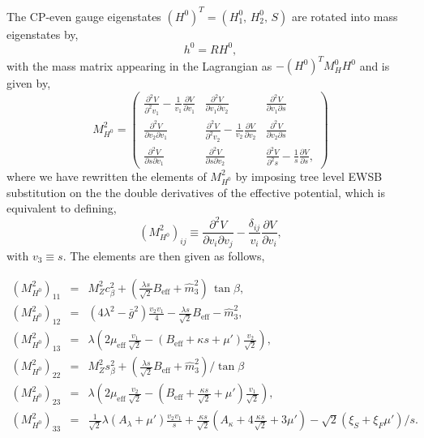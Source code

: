 \documentclass[final,3p,times,pdflatex]{elsarticle}
\newcommand{\be}{\begin{equation}}
\newcommand{\ee}{\end{equation}}
\newcommand{\ba}{\begin{eqnarray}}
\newcommand{\ea}{\end{eqnarray}}
\newcommand{\ds}{\displaystyle}
\begin{document}
The CP-even gauge eigenstates $(H^0)^T = (H_1^0,\, H_2^0, \, S)$ are rotated into mass eigenstates by,
\be h^0 = R H^0, \ee with the mass matrix appearing in the Lagrangian as  $-(H^0)^T M_H^0 H^0$ and is given by,
\be
M_{H^0}^2=
\left(
\begin{array}{ccc}
\ds\frac{\partial^2 V}{\partial^2 v_1 } - \ds\frac{1}{v_1}\frac{\partial V}{\partial v_1}&
\ds\frac{\partial^2 V}{\partial v_1 \partial v_2}&
\ds\frac{\partial^2 V}{\partial v_1 \partial s}\\[0.3cm]
\ds\frac{\partial^2 V}{\partial v_2 \partial v_1}&
\ds\frac{\partial^2 V}{\partial^2 v_2} - \ds\frac{1}{v_2}\frac{\partial V}{\partial v_2}&
\ds\frac{\partial^2 V}{\partial v_2 \partial s}\\[0.3cm]
\ds\frac{\partial^2 V}{\partial s \partial v_1}&
\ds\frac{\partial^2 V}{\partial s \partial v_2}&
\ds\frac{\partial^2 V}{\partial^2 s} - \ds\frac{1}{s}\frac{\partial V}{\partial s},
\end{array} 
\right)
 \ee where we have rewritten the elements of $M_{H^0}^2$ by imposing tree level EWSB substitution on the the double derivatives of the effective potential, which is equivalent to defining,  \be(M_{H^0}^2)_{ij} \equiv  \ds\frac{\partial^2 V}{\partial v_i \partial v_j} - \ds\frac{\delta_{ij}}{v_i}\ds\frac{\partial V}{\partial v_i}, \ee with $v_3 \equiv s$.  The elements are then given as follows,   

\ba
 (M_{H^0}^2)_{11} & = & M_Z^2 c_\beta^2 + (\ds\frac{\lambda s}{\sqrt{2}} B_\textrm{eff} +
\widehat{m}_3^2)\,\tan\beta,\\
 (M_{H^0}^2)_{12} & = & (4\lambda^2 - \bar{g}^2) \ds\frac{v_2 v_1 }{4}- 
\ds\frac{\lambda s}{\sqrt{2}} B_\textrm{eff} - \widehat{m}_3^2, \\ 
 (M_{H^0}^2)_{13} & = & \lambda (2 \mu_\textrm{eff}\,\ds\frac{ v_1}{\sqrt{2}} -
(B_\textrm{eff} + \kappa s + \mu')\ds\frac{ v_2}{\sqrt{2}}),\\
 (M_{H^0}^2)_{22} & = & M_Z^2 s_\beta^2 + (\ds\frac{\lambda s}{\sqrt{2}} B_\textrm{eff} +
\widehat{m}_3^2)/\tan\beta\, \\
 (M_{H^0}^2)_{23} & = & \lambda (2 \mu_\textrm{eff}\, \ds\frac{ v_2}{\sqrt{2}} -
(B_\textrm{eff} + \frac{\kappa s}{\sqrt{2}} + \mu')\ds\frac{ v_1}{\sqrt{2}}), \\
 (M_{H^0}^2)_{33} & = & \ds\frac{1}{\sqrt{2}}\lambda (A_\lambda + \mu') \frac{v_2 v_1}{s}
+ \frac{\kappa s}{\sqrt{2}} (A_\kappa + 4\frac{\kappa s}{\sqrt{2}}+ 3 \mu') - \sqrt{2}(\xi_S + \xi_F \mu')/s.
\label{eq:MH0}
\ea
\end{document}
